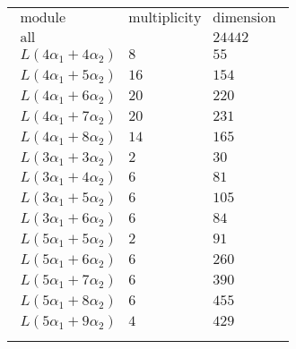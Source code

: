 \documentclass[crop,border=2mm]{standalone}
\begin{document}
\begin{tabular}{l}
$\displaystyle
\begin{array}{rll}
	\text{module}&\text{multiplicity}&\text{dimension} \\ \hline \text{all}&&24442 \\
	L\left( 4\alpha_{1}+ 4\alpha_{2}\right)&8&55\\
	L\left( 4\alpha_{1}+ 5\alpha_{2}\right)&16&154\\
	L\left( 4\alpha_{1}+ 6\alpha_{2}\right)&20&220\\
	L\left( 4\alpha_{1}+ 7\alpha_{2}\right)&20&231\\
	L\left( 4\alpha_{1}+ 8\alpha_{2}\right)&14&165\\
	L\left( 3\alpha_{1}+ 3\alpha_{2}\right)&2&30\\
	L\left( 3\alpha_{1}+ 4\alpha_{2}\right)&6&81\\
	L\left( 3\alpha_{1}+ 5\alpha_{2}\right)&6&105\\
	L\left( 3\alpha_{1}+ 6\alpha_{2}\right)&6&84\\
	L\left( 5\alpha_{1}+ 5\alpha_{2}\right)&2&91\\
	L\left( 5\alpha_{1}+ 6\alpha_{2}\right)&6&260\\
	L\left( 5\alpha_{1}+ 7\alpha_{2}\right)&6&390\\
	L\left( 5\alpha_{1}+ 8\alpha_{2}\right)&6&455\\
	L\left( 5\alpha_{1}+ 9\alpha_{2}\right)&4&429
\end{array}
$ \\ \\

\end{tabular}
\end{document}
